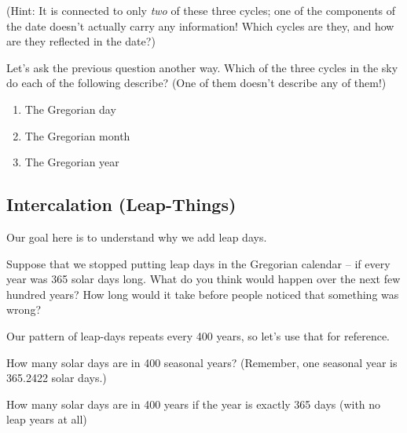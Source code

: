\documentclass[11pt]{article}
\begin{document}
(Hint: It is connected to only {\it two} of these three cycles; one of the components of the date doesn't actually carry any information! Which cycles are they, and how are they reflected in the date?)

\vspace{2in} \underline{\hspace{6in}}

Let's ask the previous question another way. Which of the three cycles in the sky do each of the following describe? (One of them doesn't describe any of them!)

\begin{enumerate}
	\item The Gregorian day
	\vspace{0.5in}
	\item The Gregorian month
		\vspace{0.5in}
	\item The Gregorian year
\end{enumerate}

\newpage

\subsection{Intercalation (Leap-Things)}

Our goal here is to understand why we add leap days. 

Suppose that we stopped putting leap days in the Gregorian calendar -- if every year was 365 solar days long. What do you think would happen over the next few hundred years? How long would it take before people noticed that something was wrong?

\vspace{1.5in}

Our pattern of leap-days repeats every 400 years, so let's use that for reference. 
\vspace{1em}

\begin{minipage}{0.45\textwidth}
How many solar days are in 400 seasonal years? (Remember, one seasonal year is 365.2422 solar days.)

\vspace{1in}

\underline{\hspace{3in}}
\end{minipage}
\hspace{0.1\textwidth}
\begin{minipage}{0.45\textwidth}
	How many solar days are in 400 years if the year is exactly 365 days (with no leap years at all)
	
	\vspace{1in}
	
	\underline{\hspace{3in}}
\end{minipage}
\end{document}
